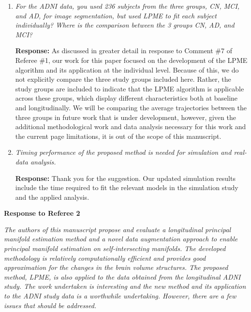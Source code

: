\documentclass[12pt]{article}
\theoremstyle{definition}
\newcommand{\revision}[1]{\textcolor{blue}{#1}}
\begin{document}
\begin{enumerate}
As discussed previously, \revision{substantial} between-image errors in estimates of subcortical structures are introduced during the process of segmenting MRI images.

\item \textit{For the ADNI data, you used 236 subjects from the three groups, CN, MCI, and AD, for image segmentation, but used LPME to fit each subject individually? Where is the comparison between the 3 groups CN, AD, and MCI?}

{\bf Response:} As discussed in greater detail in response to Comment \#7 of Referee \#1, our work for this paper focused on the development of the LPME algorithm and its application at the individual level. Because of this, we do not explicitly compare the three study groups included here. Rather, the study groups are included to indicate that the LPME algorithm is applicable across these groups, which display different characteristics both at baseline and longitudinally. We will be comparing the average trajectories between the three groups in future work that is under development, however, given the additional methodological work and data analysis necessary for this work and the current page limitations, it is out of the scope of this manuscript. 

\item \textit{Timing performance of the proposed method is needed for simulation and real-data analysis.}

{\bf Response:} Thank you for the suggestion. Our updated simulation results include the time required to fit the relevant models in the simulation study and the applied analysis.

\end{enumerate}

\vspace{0.3in}

\large{\textbf{Response to Referee 2}}

\vspace{0.25in}

{\it The authors of this manuscript propose and evaluate a longitudinal principal manifold estimation method and a novel data augmentation approach to enable principal manifold estimation on self-intersecting manifolds. The developed methodology is relatively computationally efficient and provides good approximation for the changes in the brain volume structures. The proposed method, LPME, is also applied to the data obtained from the longitudinal ADNI study.  The work undertaken is interesting and the new method and its application to the ADNI study data is a worthwhile undertaking. However, there are a few issues that should be addressed.}
\end{document}
